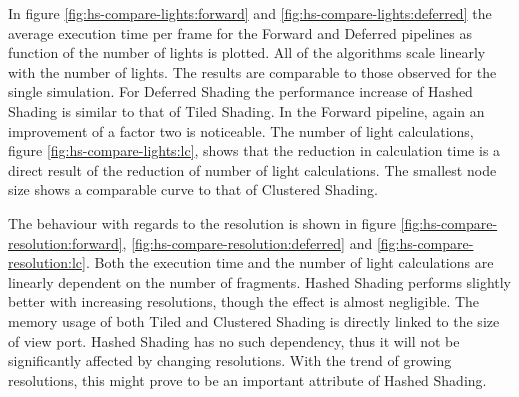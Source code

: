 

In figure \ref{fig:hs-compare-lights:forward} and \ref{fig:hs-compare-lights:deferred} the average
execution time per frame for the Forward and Deferred pipelines as
function of the number of lights is plotted. All of the algorithms scale linearly with the
number of lights. The results are comparable to those observed for the single simulation. For Deferred
Shading the performance increase of Hashed Shading is similar to that of Tiled Shading. In
the Forward pipeline, again an improvement of a factor two is noticeable.
The number of light calculations, figure \ref{fig:hs-compare-lights:lc}, shows that the
reduction in calculation time is a direct result of the reduction of number of light calculations.
The smallest node size shows a comparable curve to that of Clustered Shading.

The behaviour with regards to the resolution is shown in figure \ref{fig:hs-compare-resolution:forward},
\ref{fig:hs-compare-resolution:deferred} and \ref{fig:hs-compare-resolution:lc}.
Both the execution time and the number of light calculations are linearly dependent on
the number of fragments. 
Hashed Shading performs slightly better with increasing resolutions, though the effect
is almost negligible. The memory usage of both Tiled and Clustered Shading is directly
linked to the size of view port. Hashed Shading has no such dependency, thus it will not
be significantly affected by changing resolutions. With the trend of growing resolutions,
this might prove to be an important attribute of Hashed Shading.

